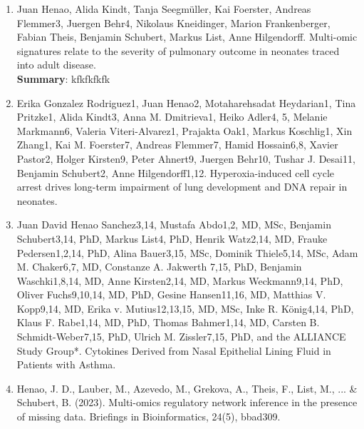 \begin{enumerate}
	\item Juan Henao, Alida Kindt, Tanja Seegmüller, Kai Foerster, Andreas Flemmer3, Juergen Behr4, Nikolaus Kneidinger, Marion Frankenberger, Fabian Theis, Benjamin Schubert, Markus List, Anne Hilgendorff. Multi-omic signatures relate to the severity of pulmonary outcome in neonates traced into adult disease.\\
	
	\textbf{Summary}: kfkfkfkfk	
	
	\item Erika Gonzalez Rodriguez1, Juan Henao2, Motaharehsadat Heydarian1, Tina Pritzke1, Alida Kindt3, Anna M. Dmitrieva1, Heiko Adler4, 5, Melanie Markmann6, Valeria Viteri-Alvarez1, Prajakta Oak1, Markus Koschlig1, Xin Zhang1, Kai M. Foerster7, Andreas Flemmer7, Hamid Hossain6,8, Xavier Pastor2, Holger Kirsten9, Peter Ahnert9, Juergen Behr10, Tushar J. Desai11, Benjamin Schubert2, Anne Hilgendorff1,12. Hyperoxia-induced cell cycle arrest drives long-term impairment of lung development and DNA repair in neonates.
	
	\item 	Juan David Henao Sanchez3,14, Mustafa Abdo1,2, MD, MSc, Benjamin Schubert3,14, PhD, Markus List4, PhD, Henrik Watz2,14, MD, Frauke Pedersen1,2,14, PhD, Alina Bauer3,15, MSc, Dominik Thiele5,14, MSc, Adam M. Chaker6,7, MD, Constanze A. Jakwerth 7,15, PhD, Benjamin Waschki1,8,14, MD, Anne Kirsten2,14, MD, Markus Weckmann9,14, PhD, Oliver Fuchs9,10,14, MD, PhD, Gesine Hansen11,16, MD, Matthias V. Kopp9,14, MD, Erika v. Mutius12,13,15, MD, MSc, Inke R. König4,14, PhD, Klaus F.  Rabe1,14, MD, PhD, Thomas Bahmer1,14, MD, Carsten B. Schmidt-Weber7,15, PhD, Ulrich M. Zissler7,15, PhD, and the ALLIANCE Study Group*. Cytokines Derived from Nasal Epithelial Lining Fluid in Patients with Asthma.
	
	\item Henao, J. D., Lauber, M., Azevedo, M., Grekova, A., Theis, F., List, M., ... \& Schubert, B. (2023). Multi-omics regulatory network inference in the presence of missing data. Briefings in Bioinformatics, 24(5), bbad309. 
\end{enumerate}